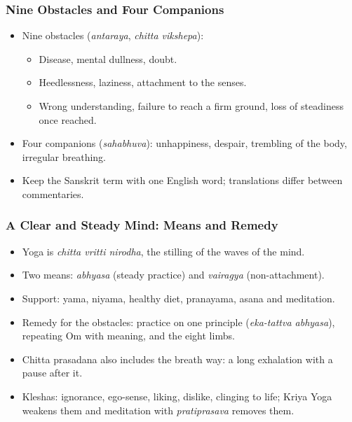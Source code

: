 \begin{frame}[fragile]\frametitle{Nine Obstacles and Four Companions}

\begin{itemize}
    \item Nine obstacles (\textit{antaraya}, \textit{chitta vikshepa}):
    \begin{itemize}
        \item Disease, mental dullness, doubt.
        \item Heedlessness, laziness, attachment to the senses.
        \item Wrong understanding, failure to reach a firm ground, loss of steadiness once reached.
    \end{itemize}
    \item Four companions (\textit{sahabhuva}): unhappiness, despair, trembling of the body, irregular breathing.
    \item Keep the Sanskrit term with one English word; translations differ between commentaries.
\end{itemize}

\end{frame}

\begin{frame}[fragile]\frametitle{A Clear and Steady Mind: Means and Remedy}

\begin{itemize}
    \item Yoga is \textit{chitta vritti nirodha}, the stilling of the waves of the mind.
    \item Two means: \textit{abhyasa} (steady practice) and \textit{vairagya} (non-attachment).
    \item Support: yama, niyama, healthy diet, pranayama, asana and meditation.
    \item Remedy for the obstacles: practice on one principle (\textit{eka-tattva abhyasa}), repeating Om with meaning, and the eight limbs.
    \item Chitta prasadana also includes the breath way: a long exhalation with a pause after it.
    \item Kleshas: ignorance, ego-sense, liking, dislike, clinging to life; Kriya Yoga weakens them and meditation with \textit{pratiprasava} removes them.
\end{itemize}

\end{frame}

